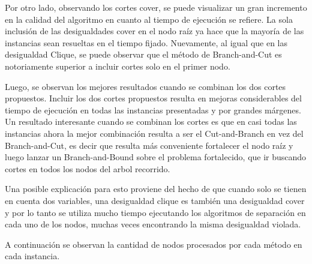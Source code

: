 Por otro lado, observando los cortes cover, se puede visualizar un gran incremento en la calidad del algoritmo en cuanto al tiempo de ejecuci\'on se refiere. La sola inclusi\'on de las desigualdades cover en el nodo ra\'iz ya hace que la mayor\'ia de las instancias sean resueltas en el tiempo fijado. Nuevamente, al igual que en las desigualdad Clique, se puede observar que el m\'etodo de Branch-and-Cut es notoriamente superior a incluir cortes solo en el primer nodo.



Luego, se observan los mejores resultados cuando se combinan los dos cortes propuestos. Incluir los dos cortes propuestos resulta en mejoras considerables del tiempo de ejecuci\'on en todas las instancias presentadas y por grandes m\'argenes. Un resultado interesante cuando se combinan los cortes es que en casi todas las instancias ahora la mejor combinaci\'on resulta a ser el Cut-and-Branch en vez del Branch-and-Cut, es decir que resulta m\'as conveniente fortalecer el nodo ra\'iz y luego lanzar un Branch-and-Bound sobre el problema fortalecido, que ir buscando cortes en todos los nodos del arbol recorrido.

Una posible explicaci\'on para esto proviene del hecho de que cuando solo se tienen en cuenta dos variables, una desigualdad clique es tambi\'en una desigualdad cover y por lo tanto se utiliza mucho tiempo ejecutando los algoritmos de separaci\'on en cada uno de los nodos, muchas veces encontrando la misma desigualdad violada.


\newpage
A continuaci\'on se observan la cantidad de nodos procesados por cada m\'etodo en cada instancia.



